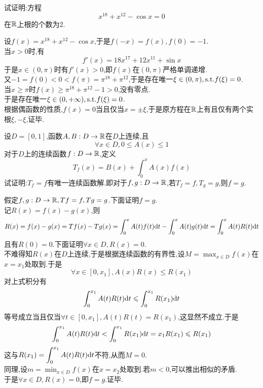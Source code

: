 \documentclass{ctexart}
\begin{document}
\begin{problem}[7.(15\songti{分})]
    试证明:方程$$x^{18}+x^{12}-\cos x=0$$在$\mathbb{R}$上根的个数为$2$.
\end{problem}
\begin{solution}[Proof.]
    设$f(x)=x^{18}+x^{12}-\cos x$,于是$f(-x)=f(x),f(0)=-1$.\\
    当$x>0$时,有$$f'(x)=18x^{17}+12x^{11}+\sin x$$
    于是$x\in(0,\pi)$时有$f'(x)>0$,即$f(x)$在$(0,\pi)$严格单调递增.\\
    又$-1=f(0)<0<f(\pi)=\pi^{18}+\pi^{12}$,于是存在唯一$\xi\in(0,\pi),\text{s.t.} f(\xi)=0$.\\
    当$x\geqslant\pi$时$f(x)\geqslant \pi^{18}+\pi^{12}-1>0$,没有零点.\\
    于是存在唯一$\xi\in(0,+\infty),\text{s.t.} f(\xi)=0$.\\
    根据偶函数的性质,$f(x)=0$当且仅当$x=\pm\xi$,于是原方程在$\mathbb{R}$上有且仅有两个实根$\xi,-\xi$,证毕.
\end{solution}
\begin{problem}[8.(15\songti{分})]
    设$D=[0,1]$,函数$A,B:D\to\mathbb{R}$在$D$上连续,且$$\forall x\in D,0\leqslant A(x)\leqslant 1$$
    对于$D$上的连续函数$f:D\to\mathbb{R}$,定义$$T_f(x)=B(x)+\int_0^xA(x)f(x)$$试证明:$T_f=f$有唯一连续函数解.即对于$f,g:D\to\mathbb{R}$,若$T_f=f,T_g=g$,则$f=g$.
\end{problem}
\begin{solution}
    假定$f,g:D\to\mathbb{R},Tf=f,Tg=g$.下面证明$f=g$.\\
    记$R(x)=f(x)-g(x)$,则
    $$R(x)=f(x)-g(x)=Tf(x)-Tg(x)=\int_0^xA(t)f(t)\mathrm{d} t-\int_0^xA(t)g(t)\mathrm{d} t=\int_0^xA(t)R(t)\mathrm{d} t$$
    且有$R(0)=0$.下面证明$\forall x\in D,R(x)=0$.\\
    不难得知$R(x)$在$D$上连续,于是根据连续函数的有界性,设$\displaystyle M=\max_{x\in D}f(x)$在$x=x_1$处取到.于是
    $$\forall x\in[0,x_1],A(x)R(x)\leqslant R(x_1)$$
    对上式积分有$$\int_0^{x_1}A(t)R(t)\mathrm{d} t\leqslant\int_0^{x_1}R(x_1)\mathrm{d} t$$
    等号成立当且仅当$\forall t\in[0,x_1],A(t)R(t)=R(x_1)$,这显然不成立.于是
    $$\int_0^{x_1}A(t)R(t)\mathrm{d} t<\int_0^{x_1}R(x_1)\mathrm{d} t=x_1R(x_1)\leqslant R(x_1)$$
    这与$\displaystyle R(x_1)=\int_0^{x_1}A(t)R(t)\mathrm{d} t$不符,从而$M=0$.\\
    同理,设$\displaystyle m=\min_{x\in D}f(x)$在$x=x_2$处取到.若$m<0$,可以推出相似的矛盾.\\
    于是$\forall x\in D,R(x)=0$,即$f=g$.证毕.
\end{solution}
\end{document}
